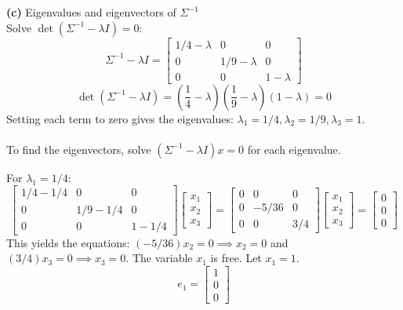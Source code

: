 \documentclass{article}
\begin{document}
\noindent \textbf{(c)} Eigenvalues and eigenvectors of $\Sigma^{-1}$ \\
Solve $\det(\Sigma^{-1} - \lambda I) = 0$:
\[
\Sigma^{-1} - \lambda I = \begin{bmatrix} 1/4-\lambda & 0 & 0 \\ 0 & 1/9-\lambda & 0 \\ 0 & 0 & 1-\lambda \end{bmatrix}
\]
\[
\det(\Sigma^{-1} - \lambda I) = \left(\frac{1}{4}-\lambda\right)\left(\frac{1}{9}-\lambda\right)(1-\lambda) = 0
\]
Setting each term to zero gives the eigenvalues: $\lambda_1 = 1/4, \lambda_2 = 1/9, \lambda_3 = 1$.
\\ \\
To find the eigenvectors, solve $(\Sigma^{-1} - \lambda I)x = 0$ for each eigenvalue.

For $\lambda_1 = 1/4$:
\[
\begin{bmatrix} 1/4-1/4 & 0 & 0 \\ 0 & 1/9-1/4 & 0 \\ 0 & 0 & 1-1/4 \end{bmatrix} \begin{bmatrix} x_1 \\ x_2 \\ x_3 \end{bmatrix} = \begin{bmatrix} 0 & 0 & 0 \\ 0 & -5/36 & 0 \\ 0 & 0 & 3/4 \end{bmatrix} \begin{bmatrix} x_1 \\ x_2 \\ x_3 \end{bmatrix} = \begin{bmatrix} 0 \\ 0 \\ 0 \end{bmatrix}
\]
This yields the equations: $(-5/36)x_2 = 0 \implies x_2 = 0$ and $(3/4)x_3 = 0 \implies x_3 = 0$. The variable $x_1$ is free. Let $x_1 = 1$.
\[
e_1 = \begin{bmatrix} 1 \\ 0 \\ 0 \end{bmatrix}
\]
\end{document}
